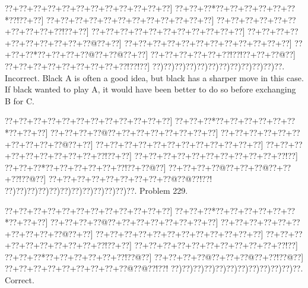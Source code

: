 \documentclass[a5paper]{article}
\begin{document}
\begin{center}
{\goo
\0??+\0??+\0??+\0??+\0??+\0??+\0??+\0??+\0??+\0??+\0??+\0??]
\0??+\0??+\0??*\0??+\0??+\0??+\0??+\0??+\0??*\0??!\0??+\0??]
\0??+\0??+\0??+\0??+\0??+\0??+\0??+\0??+\0??+\0??+\0??+\0??]
\0??+\0??+\0??+\0??+\0??+\0??+\0??+\0??+\0??+\0??!\0??+\0??]
\0??+\0??+\0??+\0??+\0??+\0??+\0??+\0??+\0??+\0??+\0??]
\0??+\0??+\0??+\0??+\0??+\0??+\0??+\0??+\0??+\0??@\0??+\0??]
\0??+\0??+\0??+\0??+\0??+\0??+\0??+\0??+\0??+\0??+\0??+\0??]
\0??+\0??+\0??*\0??+\0??+\0??+\0??@\0??+\0??@\0??+\0??]
\0??+\0??+\0??+\0??+\0??+\0??!\0??!\0??+\0??+\0??@\0??]
\0??+\0??+\0??+\0??+\0??+\0??+\0??+\0??+\0??!\0??!\0??]
\0??)\0??)\0??)\0??)\0??)\0??)\0??)\0??)\0??)\0??)\0??)\0??.
}
Incorrect. Black A is often a good idea, but black has a sharper move in this case. If black wanted to play A, it would have been better to do so before exchanging B for C.

\end{center}
\newpage
\begin{center}
{\goo
\0??+\0??+\0??+\0??+\0??+\0??+\0??+\0??+\0??+\0??+\0??+\0??]
\0??+\0??+\0??*\0??+\0??+\0??+\0??+\0??+\0??*\0??+\0??+\0??]
\0??+\0??+\0??+\0??@\0??+\0??+\0??+\0??+\0??+\0??+\0??+\0??]
\0??+\0??+\0??+\0??+\0??+\0??+\0??+\0??+\0??+\0??@\0??+\0??]
\0??+\0??+\0??+\0??+\0??+\0??+\0??+\0??+\0??+\0??+\0??+\0??]
\0??+\0??+\0??+\0??+\0??+\0??+\0??+\0??+\0??+\0??!\0??+\0??]
\0??+\0??+\0??+\0??+\0??+\0??+\0??+\0??+\0??+\0??+\0??!\0??]
\0??+\0??+\0??*\0??+\0??+\0??+\0??+\0??+\0??!\0??+\0??@\0??]
\0??+\0??+\0??+\0??@\0??+\0??+\0??@\0??+\0??+\0??!\0??@\0??]
\0??+\0??+\0??+\0??+\0??+\0??+\0??+\0??+\0??@\0??@\0??!\0??!
\0??)\0??)\0??)\0??)\0??)\0??)\0??)\0??)\0??)\0??)\0??)\0??.
}
Problem 229.

\end{center}
\begin{center}
{\goo
\0??+\0??+\0??+\0??+\0??+\0??+\0??+\0??+\0??+\0??+\0??+\0??]
\0??+\0??+\0??*\0??+\0??+\0??+\0??+\0??+\0??*\0??+\0??+\0??]
\0??+\0??+\0??+\0??@\0??+\0??+\0??+\0??+\0??+\0??+\0??+\0??]
\0??+\0??+\0??+\0??+\0??+\0??+\0??+\0??+\0??+\0??@\0??+\0??]
\0??+\0??+\0??+\0??+\0??+\0??+\0??+\0??+\0??+\0??+\0??+\0??]
\0??+\0??+\0??+\0??+\0??+\0??+\0??+\0??+\0??+\0??!\0??+\0??]
\0??+\0??+\0??+\0??+\0??+\0??+\0??+\0??+\0??+\0??+\0??!\0??]
\0??+\0??+\0??*\0??+\0??+\0??+\0??+\0??+\0??!\0??@\0??]
\0??+\0??+\0??+\0??@\0??+\0??+\0??@\0??+\0??!\0??@\0??]
\0??+\0??+\0??+\0??+\0??+\0??+\0??+\0??+\0??@\0??@\0??!\0??!
\0??)\0??)\0??)\0??)\0??)\0??)\0??)\0??)\0??)\0??)\0??)\0??.
}
Correct. 

\end{center}
\end{document}
